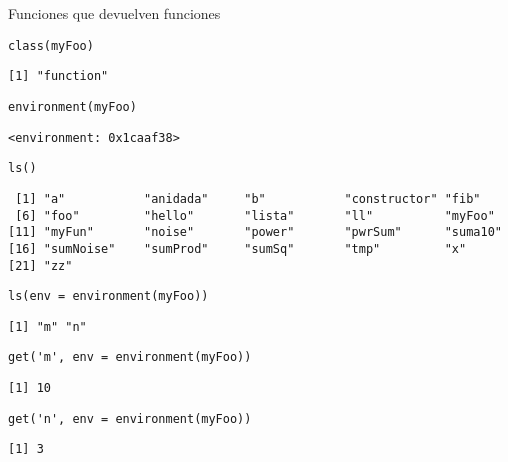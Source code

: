 \documentclass[xcolor={usenames,svgnames,dvipsnames}]{beamer}
\begin{document}
\begin{frame}[fragile,label={sec:orgheadline19}]{Funciones que devuelven funciones}
 \lstset{language=R,label= ,caption= ,captionpos=b,numbers=none}
\begin{lstlisting}
class(myFoo)
\end{lstlisting}

\begin{verbatim}
[1] "function"
\end{verbatim}

\lstset{language=R,label= ,caption= ,captionpos=b,numbers=none}
\begin{lstlisting}
environment(myFoo)
\end{lstlisting}

\begin{verbatim}
<environment: 0x1caaf38>
\end{verbatim}

\lstset{language=R,label= ,caption= ,captionpos=b,numbers=none}
\begin{lstlisting}
ls()
\end{lstlisting}

\begin{verbatim}
 [1] "a"           "anidada"     "b"           "constructor" "fib"        
 [6] "foo"         "hello"       "lista"       "ll"          "myFoo"      
[11] "myFun"       "noise"       "power"       "pwrSum"      "suma10"     
[16] "sumNoise"    "sumProd"     "sumSq"       "tmp"         "x"          
[21] "zz"
\end{verbatim}

\lstset{language=R,label= ,caption= ,captionpos=b,numbers=none}
\begin{lstlisting}
ls(env = environment(myFoo))
\end{lstlisting}

\begin{verbatim}
[1] "m" "n"
\end{verbatim}

\lstset{language=R,label= ,caption= ,captionpos=b,numbers=none}
\begin{lstlisting}
get('m', env = environment(myFoo))
\end{lstlisting}

\begin{verbatim}
[1] 10
\end{verbatim}

\lstset{language=R,label= ,caption= ,captionpos=b,numbers=none}
\begin{lstlisting}
get('n', env = environment(myFoo))
\end{lstlisting}

\begin{verbatim}
[1] 3
\end{verbatim}
\end{frame}
\end{document}
